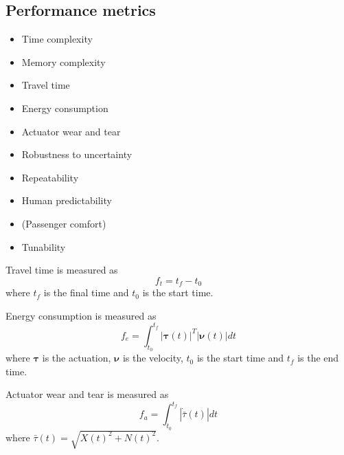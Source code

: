 \subsection{Performance metrics}
\begin{itemize}
  \item Time complexity
  \item Memory complexity
  \item Travel time
  \item Energy consumption
  \item Actuator wear and tear
  \item Robustness to uncertainty
  \item Repeatability
  \item Human predictability
  \item (Passenger comfort)
  \item Tunability
\end{itemize}

Travel time is measured as
\begin{equation}
	f_t = t_f - t_0
\end{equation}
where $t_f$ is the final time and $t_0$ is the start time.

Energy consumption is measured as
\begin{equation}
	\label{eq:metric_energy}
	f_e = \int_{t_0}^{t_f} |\boldsymbol{\tau}(t)|^T|\boldsymbol{\nu}(t)|dt
\end{equation}
where $\boldsymbol{\tau}$ is the actuation, $\boldsymbol{\nu}$ is the velocity, $t_0$ is the start time and $t_f$ is the end time. 


Actuator wear and tear is measured as
\begin{equation}
	\label{eq:metric_actuator}
	f_a = \int_{t_0}^{t_f} |\dot{\bar{\tau}}(t)| dt
\end{equation}
where $\bar{\tau}(t) = \sqrt{X(t)^2+N(t)^2}$.

